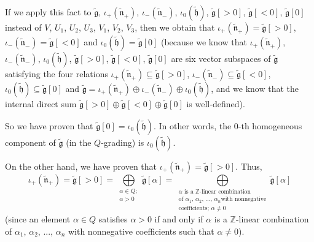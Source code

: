 \documentclass[etingof-lie.tex]{subfiles}
\begin{document}
If we apply this fact to $\widetilde{\mathfrak{g}}$, $\iota_{+}\left(
\widetilde{\mathfrak{n}}_{+}\right)  $, $\iota_{-}\left(
\widetilde{\mathfrak{n}}_{-}\right)  $, $\iota_{0}\left(
\widetilde{\mathfrak{h}}\right)  $, $\widetilde{\mathfrak{g}}\left[
>0\right]  $, $\widetilde{\mathfrak{g}}\left[  <0\right]  $,
$\widetilde{\mathfrak{g}}\left[  0\right]  $ instead of $V$, $U_{1}$, $U_{2}$,
$U_{3}$, $V_{1}$, $V_{2}$, $V_{3}$, then we obtain that $\iota_{+}\left(
\widetilde{\mathfrak{n}}_{+}\right)  =\widetilde{\mathfrak{g}}\left[
>0\right]  $, $\iota_{-}\left(  \widetilde{\mathfrak{n}}_{-}\right)
=\widetilde{\mathfrak{g}}\left[  <0\right]  $ and $\iota_{0}\left(
\widetilde{\mathfrak{h}}\right)  =\widetilde{\mathfrak{g}}\left[  0\right]  $
(because we know that $\iota_{+}\left(  \widetilde{\mathfrak{n}}_{+}\right)
$, $\iota_{-}\left(  \widetilde{\mathfrak{n}}_{-}\right)  $, $\iota_{0}\left(
\widetilde{\mathfrak{h}}\right)  $, $\widetilde{\mathfrak{g}}\left[
>0\right]  $, $\widetilde{\mathfrak{g}}\left[  <0\right]  $,
$\widetilde{\mathfrak{g}}\left[  0\right]  $ are six vector subspaces of
$\widetilde{\mathfrak{g}}$ satisfying the four relations $\iota_{+}\left(
\widetilde{\mathfrak{n}}_{+}\right)  \subseteq\widetilde{\mathfrak{g}}\left[
>0\right]  $, $\iota_{-}\left(  \widetilde{\mathfrak{n}}_{-}\right)
\subseteq\widetilde{\mathfrak{g}}\left[  <0\right]  $, $\iota_{0}\left(
\widetilde{\mathfrak{h}}\right)  \subseteq\widetilde{\mathfrak{g}}\left[
0\right]  $ and $\widetilde{\mathfrak{g}}=\iota_{+}\left(
\widetilde{\mathfrak{n}}_{+}\right)  \oplus\iota_{-}\left(
\widetilde{\mathfrak{n}}_{-}\right)  \oplus\iota_{0}\left(
\widetilde{\mathfrak{h}}\right)  $, and we know that the internal direct sum
$\widetilde{\mathfrak{g}}\left[  >0\right]  \oplus\widetilde{\mathfrak{g}%
}\left[  <0\right]  \oplus\widetilde{\mathfrak{g}}\left[  0\right]  $ is well-defined).

So we have proven that $\widetilde{\mathfrak{g}}\left[  0\right]  =\iota
_{0}\left(  \widetilde{\mathfrak{h}}\right)  $. In other words, the $0$-th
homogeneous component of $\widetilde{\mathfrak{g}}$ (in the $Q$-grading) is
$\iota_{0}\left(  \widetilde{\mathfrak{h}}\right)  $.

On the other hand, we have proven that $\iota_{+}\left(
\widetilde{\mathfrak{n}}_{+}\right)  =\widetilde{\mathfrak{g}}\left[
>0\right]  $. Thus,%
\[
\iota_{+}\left(  \widetilde{\mathfrak{n}}_{+}\right)  =\widetilde{\mathfrak{g}%
}\left[  >0\right]  =\bigoplus\limits_{\substack{\alpha\in Q;\\\alpha
>0}}\widetilde{\mathfrak{g}}\left[  \alpha\right]  =\bigoplus
\limits_{\substack{\alpha\text{ is a }\mathbb{Z}\text{-linear combination}%
\\\text{of }\alpha_{1}\text{, }\alpha_{2}\text{, }...\text{, }\alpha_{n}\text{
with nonnegative}\\\text{coefficients; }\alpha\neq0}}\widetilde{\mathfrak{g}%
}\left[  \alpha\right]
\]
(since an element $\alpha\in Q$ satisfies $\alpha>0$ if and only if $\alpha$
is a $\mathbb{Z}$-linear combination of $\alpha_{1}$, $\alpha_{2}$, $...$,
$\alpha_{n}$ with nonnegative coefficients such that $\alpha\neq0$).
\end{document}
